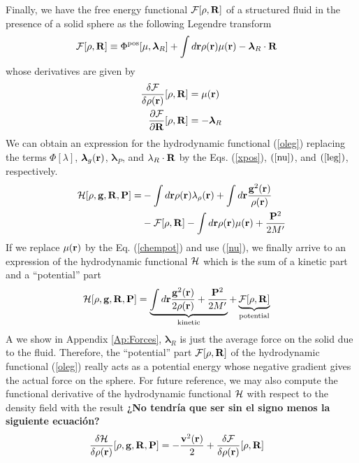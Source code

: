 \documentclass[b5paper,openright,11pt]{book}
\newcommand{\Note}[1]{{\bf \color{red}#1}}    %
\begin{document}
Finally, we have the free energy functional ${\cal  F}[\rho,{\bf R}]$ of a structured fluid in the presence of a solid sphere as the following Legendre transform
\begin{align}
  {\cal F}[\rho,{\bf R}]&\equiv  \Phi^{\rm pos}[\mu,\boldsymbol{\lambda}_R]
+
\int d{\bf r}\rho({\bf r})\mu({\bf r})-\boldsymbol{\lambda}_R\cdot{\bf R}
\label{leg}
\end{align}
whose derivatives are given by 
\begin{align}
   \frac{\delta {\cal F}}{\delta\rho({\bf r})}[\rho,{\bf R}] &=\mu({\bf r})
\nonumber\\
   \frac{\partial {\cal F}}{\partial{\bf R}}[\rho,{\bf R}] &=-\boldsymbol{\lambda}_R
\label{Fd2}
\end{align}
We can obtain an expression for the  hydrodynamic functional (\ref{oleg}) replacing the terms $\Phi[\lambda]$, $\boldsymbol{\lambda}_g({\bf r})$, $\boldsymbol{\lambda}_P$, and $\lambda_R\cdot{\bf R}$ by the Eqs. (\ref{xpos}), $(\ref{nu})$, and $(\ref{leg})$, respectively. 
\begin{align}
  {\cal H}[\rho,{\bf g},{\bf R},{\bf P}] =& 
  -\int d{\bf r} \rho({\bf r})\lambda_{\rho}({\bf r}) 
  +\int d{\bf r}\frac{{\bf g}^2({\bf r})}{\rho({\bf r})} 
  \nonumber\\
  &- {\cal F}[\rho,{\bf R}] -\int d{\bf r}\rho({\bf r})\mu({\bf r}) + \frac{{\bf P}^2}{2M'}
\end{align}
If we replace $\mu({\bf r})$ by the Eq. (\ref{chempot}) and use (\ref{nu}), we finally arrive to an expression of the hydrodynamic functional ${\cal H}$ which is the sum of a kinetic part and a ``potential'' part
\begin{align}
  {\cal H}[\rho,{\bf g},{\bf R},{\bf P}] &=   
  \underbrace{\int d{\bf r}\frac{{\bf g}^2({\bf r})}{2\rho({\bf r})} +\frac{{\bf P}^2}{2M'}}_{\rm kinetic}
  +\underbrace{{\cal F}[\rho,{\bf R}]}_{\rm potential}
\label{oleg2}
\end{align}
A we show in Appendix \ref{Ap:Forces}, $\boldsymbol{\lambda}_R$
is just the  average force on the solid due  to the fluid.  Therefore,
the ``potential''  part ${\cal  F}[\rho,{\bf R}]$ of  the hydrodynamic
functional  (\ref{oleg})  really  acts  as a  potential  energy  whose
negative gradient  gives the actual  force on the sphere.   For future
reference,  we  may also  compute  the  functional derivative  of  the
hydrodynamic functional ${\cal  H}$ with respect to  the density field
with the result
\Note{¿No tendría que ser sin el signo menos la siguiente ecuación?}
\begin{align}
  \frac{\delta {\cal H}}{\delta\rho({\bf r})}[\rho,{\bf g},{\bf R},{\bf P}] &=    
-\frac{{\bf v}^2({\bf r})}{2}+  \frac{\delta {\cal F}}{\delta\rho({\bf r})}[\rho,{\bf R}]
\end{align}
\end{document}
